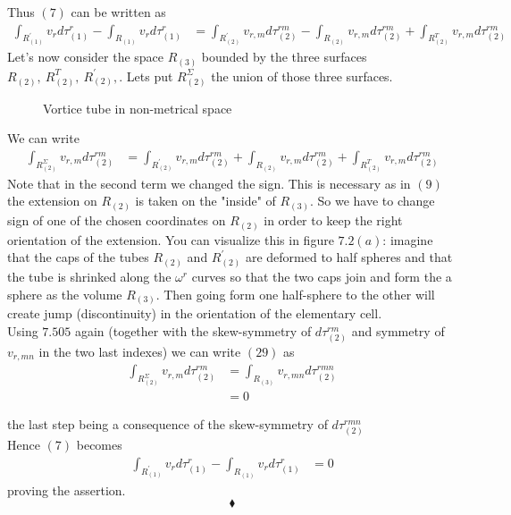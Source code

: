 Thus $(7)$ can be written as 
\begin{align}
\int_{R^{'}_{(1)}}v_r d\tau_{(1)}^r - \int_{R^{}_{(1)}}v_r d\tau_{(1)}^r &= \int_{R^{'}_{(2)}}v_{r,m}d\tau_{(2)}^{rm} - \int_{R^{}_{(2)}}v_{r,m}d\tau_{(2)}^{rm}+\int_{R^{T}_{(2)}}v_{r,m}d\tau_{(2)}^{rm} 
\end{align}
Let's now consider the space $R_{(3)}$ bounded by the three surfaces $R^{}_{(2)}, \ R^{T}_{(2)}, \ R^{'}_{(2)},$. Lets put $R^\Sigma_{(2)}$ the union of those three surfaces.\begin{figure}[H]%
    \centering
    \subfloat[]{}
\caption{Vortice tube in non-metrical space}
\label{fig:fig_p280b}
\end{figure}

We can write
\begin{align}
\int_{R^\Sigma_{(2)}}v_{r,m}d\tau_{(2)}^{rm}  &= \int_{R^{'}_{(2)}}v_{r,m}d\tau_{(2)}^{rm} + \int_{R^{}_{(2)}}v_{r,m}d\tau_{(2)}^{rm}+\int_{R^{T}_{(2)}}v_{r,m}d\tau_{(2)}^{rm} 
\end{align}
Note that in the second term we changed the sign. This is necessary as in $(9)$ the extension on $R^{}_{(2)}$ is taken on the "inside" of $ R_{(3)}$. So we have to change sign of one of the chosen coordinates on $R^{}_{(2)}$ in order to keep the right orientation of the extension. You can visualize this in figure $7.2(a)$: imagine that the caps of the tubes $R^{}_{(2)}$ and $R^{'}_{(2)}$ are deformed to half spheres and that the tube is  shrinked along the $\omega^r$ curves so that the two caps join and form the a sphere as the volume $R_{(3)}$. Then going form one half-sphere to the other will create jump (discontinuity) in the orientation of the elementary cell.\\
Using $\mathbf{7.505}$ again (together with the skew-symmetry of $d\tau_{(2)}^{rm}$ and symmetry of $v_{r,mn}$ in the two last indexes) we can write $(29)$   as 
\begin{align}
\int_{R^\Sigma_{(2)}}v_{r,m}d\tau_{(2)}^{rm}  &= \int_{R^{}_{(3)}}v_{r,mn}d\tau_{(2)}^{rmn}\\
&=0
\end{align}

the last step being a consequence of the skew-symmetry of $d\tau_{(2)}^{rmn}$\\
Hence $(7)$ becomes 
\begin{align}
\int_{R^{'}_{(1)}}v_r d\tau_{(1)}^r - \int_{R^{}_{(1)}}v_r d\tau_{(1)}^r &= 0
\end{align}
proving the assertion.
$$\blacklozenge$$
\newpage



